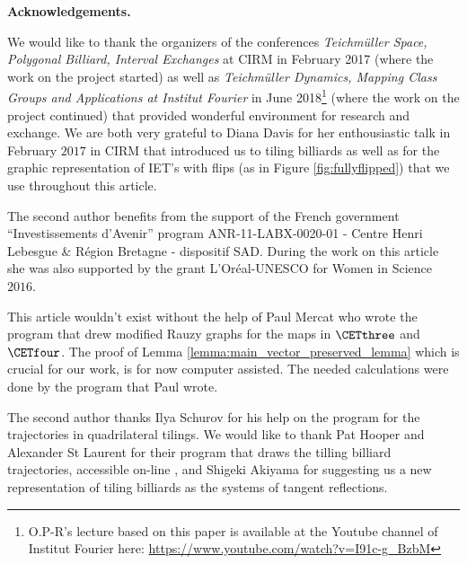\documentclass[12pt]{article}
\theoremstyle{definition}
\begin{document}
\begin{center}
\textbf{Acknowledgements.}
\end{center}
We would like to thank the organizers of the conferences \emph{Teichmüller Space, Polygonal Billiard, Interval Exchanges} at CIRM in February 2017 (where the work on the project started) as well as \emph{Teichmüller Dynamics, Mapping Class Groups and Applications at Institut Fourier} in June 2018\footnote{O.P-R's lecture based on this paper is available at the Youtube channel of Institut Fourier here: \url{https://www.youtube.com/watch?v=I91c-g_BzbM}\href{https://www.youtube.com/watch?v=I91c-g_BzbM}{}} (where the work on the project continued) that provided wonderful environment for research and exchange. We are both very grateful to Diana Davis for her enthousiastic talk in February $2017$ in CIRM that introduced us to tiling billiards as well as for the graphic representation of IET's with flips (as in Figure \ref{fig:fullyflipped}) that we use throughout this article.

The second author benefits from the support of the French government “Investissements d’Avenir” program ANR-11-LABX-0020-01 - Centre Henri Lebesgue \& Région Bretagne - dispositif SAD. During the work on this article she was also supported by the grant L'Oréal-UNESCO for Women in Science $2016$. 

This article wouldn't exist without the help of Paul Mercat who wrote the program that drew modified Rauzy graphs for the maps in $\CETthree$ and $\CETfour$. The proof of Lemma \ref{lemma:main_vector_preserved_lemma} which is crucial for our work, is for now computer assisted. The needed calculations were done by the program that Paul wrote. 

The second author thanks Ilya Schurov for his help on the program for the trajectories in quadrilateral tilings. We would like to thank Pat Hooper and Alexander St Laurent for their program that draws the tilling billiard trajectories, accessible on-line \cite{HSL}, and Shigeki Akiyama for suggesting us a new representation of tiling billiards as the systems of tangent reflections. 
\end{document}
